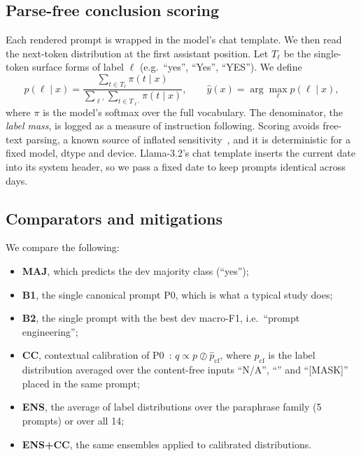 \documentclass[acmsmall,nonacm]{acmart}
\begin{document}
\subsection{Parse-free conclusion scoring}
Each rendered prompt is wrapped in the model's chat template. We then read the next-token distribution at the first assistant position. Let $T_\ell$ be the single-token surface forms of label $\ell$ (e.g.\ ``yes'', ``Yes'', ``YES''). We define
\begin{equation}
  p(\ell \mid x) = \frac{\sum_{t \in T_\ell} \pi(t \mid x)}{\sum_{\ell'} \sum_{t \in T_{\ell'}} \pi(t \mid x)}, \qquad \hat{y}(x) = \arg\max_\ell p(\ell \mid x),
\end{equation}
where $\pi$ is the model's softmax over the full vocabulary. The denominator, the \emph{label mass}, is logged as a measure of instruction following. Scoring avoids free-text parsing, a known source of inflated sensitivity~\cite{hua2025flaw}, and it is deterministic for a fixed model, dtype and device. Llama-3.2's chat template inserts the current date into its system header, so we pass a fixed date to keep prompts identical across days.

\subsection{Comparators and mitigations}
We compare the following:
\begin{itemize}
  \item \textbf{MAJ}, which predicts the dev majority class (``yes'');
  \item \textbf{B1}, the single canonical prompt P0, which is what a typical study does;
  \item \textbf{B2}, the single prompt with the best dev macro-F1, i.e.\ ``prompt engineering'';
  \item \textbf{CC}, contextual calibration of P0~\cite{zhao2021calibrate}: $q \propto p \oslash \hat{p}_{\text{cf}}$, where $\hat{p}_{\text{cf}}$ is the label distribution averaged over the content-free inputs ``N/A'', ``'' and ``[MASK]'' placed in the same prompt;
  \item \textbf{ENS}, the average of label distributions over the paraphrase family (5 prompts) or over all 14;
  \item \textbf{ENS+CC}, the same ensembles applied to calibrated distributions.
\end{itemize}
\end{document}
